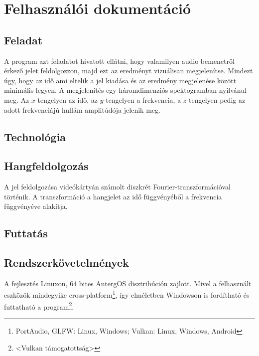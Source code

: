 
\section{Felhaszn\'al\'oi dokument\'aci\'o}
\subsection{Feladat}
A program azt feladatot hivatott ell\'atni, hogy valamilyen audio bemenetr\"ol \'erkez\H o jelet feldolgozzon, majd ezt az eredm\'enyt vizu\'alisan megjelen\'itse. Mindezt \'ugy, hogy az id\H o ami eltelik a jel kiad\'asa \'es az eredm\'eny megjelen\'ese k\"oz\"ott minim\'alis legyen.
A megjelen\'it\'es egy h\'aromdimenzi\'os spektogramban nyilv\'anul meg. Az $x$-tengelyen az id\H o, az $y$-tengelyen a frekvencia, a $z$-tengelyen pedig az adott frekvenci\'aj\'u hull\'am amplit\'ud\'oja jelenik meg.

\subsection{Technol\'ogia}

\subsection{Hangfeldolgoz\'as}
A jel feldolgoz\'asa vide\'ok\'arty\'an sz\'amolt diszkr\'et Fourier-transzform\'aci\'oval t\"ort\'enik. A transzform\'aci\'o a hangjelet az id\H o f\"uggv\'eny\'eb\H ol a frekvencia f\"uggv\'eny\'eve alak\'itja. 

\subsection{Futtat\'as}

\subsection{Rendszerk\"ovetelm\'enyek}
A fejleszt\'es Linuxon, 64 bites AntergOS disztrib\'uci\'on zajlott. Mivel a felhaszn\'alt eszk\"oz\"ok mindegyike cross-platform\footnote{PortAudio, GLFW: Linux, Windows; Vulkan: Linux, Windows, Android}, \'igy elm\'eletben Windowson is ford\'ithat\'o \'es futtathat\'o a program\footnote{<Vulkan t\'amogatotts\'ag>}.
